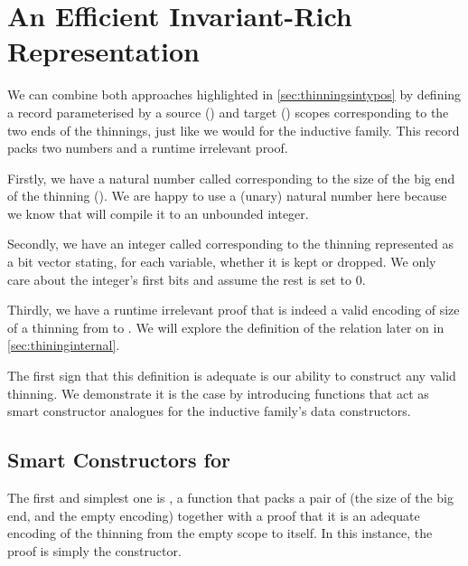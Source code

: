 
\section{An Efficient Invariant-Rich Representation}\label{sec:efficient}

We can combine both approaches highlighted in \cref{sec:thinningsintypos}
by defining a record parameterised by a source
() and target () scopes corresponding to the two
ends of the thinnings, just like we would for the inductive family. This record
packs two numbers and a runtime irrelevant proof.

Firstly, we have a natural number called  corresponding
to the size of the big end of the thinning ().
%
We are happy to use a (unary) natural number here because we know that \idris{}
will compile it to an unbounded integer.

Secondly, we have an integer called  corresponding to
the thinning represented as a bit vector stating, for each variable, whether
it is kept or dropped. We only care about the integer's 
first bits and assume the rest is set to 0.

Thirdly, we have a runtime irrelevant proof  that
 is indeed a valid encoding of size 
of a thinning from  to . We will explore the
definition of the relation  later on
in \cref{sec:thininginternal}.


The first sign that this definition is adequate is our ability to construct
any valid thinning. We demonstrate it is the case by introducing functions
that act as smart constructor analogues for the inductive family's data
constructors.

\subsection{Smart Constructors for }

The first and simplest one is , a function that packs a pair of
 (the size of the big end, and the empty encoding) together with a proof
that it is an adequate encoding of the thinning from the empty scope to itself.
In this instance, the proof is simply the  constructor.

